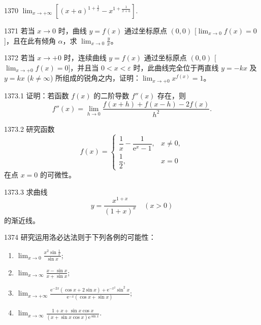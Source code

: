 \begin{prob}[S]{1370}
$\lim_{x \to +\infty} \left[ (x + a)^{1 + \frac{1}{x}} - x^{1 + \frac{1}{x + a}} \right]$.
\end{prob}

\begin{prob}[M]{1371}
若当 $x \to 0$ 时，曲线 $y = f(x)$ 通过坐标原点 $(0, 0)$ [$\lim_{x \to 0} f(x) = 0$]，且在此有倾角 $\alpha$，求 $\lim_{x \to 0} \frac{y}{x}$。
\end{prob}

\begin{prob}[M]{1372}
若当 $x \to +0$ 时，连续曲线 $y = f(x)$ 通过坐标原点 $(0, 0)$ [$\lim_{x \to +0} f(x) = 0$]，并且当 $0 < x < \varepsilon$ 时，此曲线完全位于两直线 $y = -kx$ 及 $y = kx$ ($k \neq \infty$) 所组成的锐角之内，证明：$\lim_{x \to +0} x^{f(x)} = 1$。
\end{prob}

\begin{prob}[M]{1373.1}
证明：若函数 $f(x)$ 的二阶导数 $f''(x)$ 存在，则
\[
f''(x) = \lim_{h \to 0} \frac{f(x + h) + f(x - h) - 2f(x)}{h^2}.
\]
\end{prob}

\begin{prob}[M]{1373.2}
研究函数
\[
f(x) = \begin{cases} \dfrac{1}{x} - \dfrac{1}{\mathrm{e}^x - 1}, & x \neq 0, \\ \dfrac{1}{2}, & x = 0 \end{cases}
\]
在点 $x = 0$ 的可微性。
\end{prob}

\begin{prob}[M]{1373.3}
求曲线
\[
y = \frac{x^{1 + x}}{(1 + x)^x} \quad (x > 0)
\]
的渐近线。
\end{prob}

\begin{prob}[L]{1374}
研究运用洛必达法则于下列各例的可能性：
\begin{enumerate}[label=(\alph*), itemsep=2pt, topsep=3pt]
\item $\lim_{x \to 0} \frac{x^2 \sin\frac{1}{x}}{\sin x}$;
\item $\lim_{x \to \infty} \frac{x - \sin x}{x + \sin x}$;
\item $\lim_{x \to +\infty} \frac{\mathrm{e}^{-2x}(\cos x + 2\sin x) + \mathrm{e}^{-x^2}\sin^2 x}{\mathrm{e}^{-x}(\cos x + \sin x)}$;
\item $\lim_{x \to \infty} \frac{1 + x + \sin x\cos x}{(x + \sin x\cos x)\mathrm{e}^{\sin x}}$.
\end{enumerate}
\end{prob}


